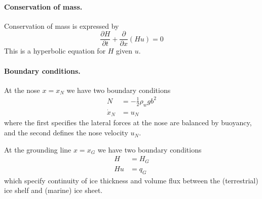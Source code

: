 \documentclass{jknotes}
\begin{document}
\paragraph{Conservation of mass.} Conservation of mass is expressed by
\begin{equation}
	\frac{\partial H}{\partial t} + \frac{\partial}{\partial x} (Hu) = 0
	\label{eq:l15:2}
\end{equation}
This is a hyperbolic equation for $H$ given $u$.

\paragraph{Boundary conditions.} At the nose $x=x_N$ we have two boundary
conditions
\begin{align}
	N &= -\frac{1}{2}\rho_w g b^2 \label{eq:l15:3}\\
	\dot{x}_N &= u_N \label{eq:l15:4}
\end{align}
where the first specifies the lateral forces at the nose are balanced by
buoyancy,  and the second defines the nose velocity $u_N$.

At the grounding line $x=x_G$ we have two boundary conditions
\begin{align}
	H &= H_G \label{eq:l15:5}\\
	Hu &= q_G \label{eq:l15:6}
\end{align}
which specify continuity of ice thickness and volume flux between the
(terrestrial) ice shelf and (marine) ice sheet.
\end{document}
